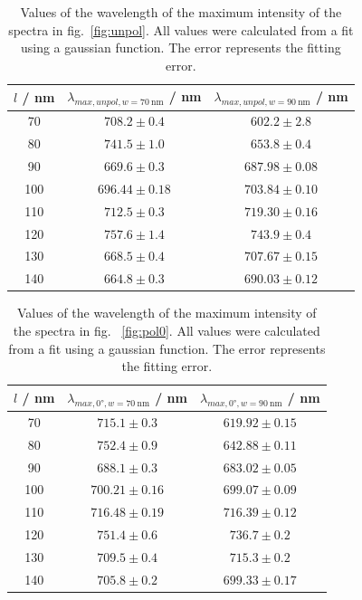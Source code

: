 \begin{table}
    \centering
    \begin{tabular}{c|cc}
        \toprule
        $l$ / \si{\nano\meter} &   $\lambda_{max,unpol,w=\SI{70}{\nano\meter}}$ / \si{\nano\meter}& $\lambda_{max,unpol,w=\SI{90}{\nano\meter}}$ / \si{\nano\meter}\\
        \midrule
        70  &  $708.2 \pm 0.4$&  $602.2 \pm 2.8$\\
        80  &  $741.5 \pm 1.0$&  $653.8 \pm 0.4$\\
        90  &  $669.6 \pm 0.3$&  $687.98 \pm 0.08$\\
        100 &  $696.44 \pm 0.18$&  $703.84 \pm 0.10$\\
        110 &  $712.5 \pm 0.3$&  $719.30 \pm 0.16$\\
        120 &  $757.6 \pm 1.4$&  $743.9 \pm 0.4$\\
        130 &  $668.5 \pm 0.4$&  $707.67 \pm 0.15$\\
        140 &  $664.8 \pm 0.3$&  $690.03 \pm 0.12$\\
        \bottomrule
    \end{tabular}
    \caption{Values of the wavelength of the maximum intensity of the spectra in fig.~\ref{fig:unpol}. All values were calculated from a fit using a gaussian function. The error represents the fitting error.}
    \label{tab:lamMaxUn}
\end{table}

\begin{table}
    \centering
    \begin{tabular}{c|cc}
        \toprule
        $l$ / \si{\nano\meter} &   $\lambda_{max,\ang{0},w=\SI{70}{\nano\meter}}$ / \si{\nano\meter}& $\lambda_{max,\ang{0},w=\SI{90}{\nano\meter}}$ / \si{\nano\meter}\\
        \midrule
        70 &  $715.1 \pm 0.3$&  $619.92\pm 0.15$\\
        80 &  $752.4 \pm 0.9$&  $642.88\pm 0.11$\\
        90  &  $688.1\pm 0.3$&  $683.02\pm 0.05$\\
        100 &  $700.21\pm 0.16$&  $699.07\pm 0.09$\\
        110 &  $716.48\pm 0.19$&  $716.39\pm 0.12$\\
        120 &  $751.4\pm 0.6$&  $736.7\pm 0.2$\\
        130 &  $709.5\pm 0.4$&  $715.3\pm 0.2$\\
        140 &  $705.8\pm 0.2$&  $699.33\pm 0.17$\\
        \bottomrule
    \end{tabular}
    \caption{Values of the wavelength of the maximum intensity of the spectra in fig.~ \ref{fig:pol0}. All values were calculated from a fit using a gaussian function. The error represents the fitting error.}
    \label{tab:lamMax0}
\end{table}

